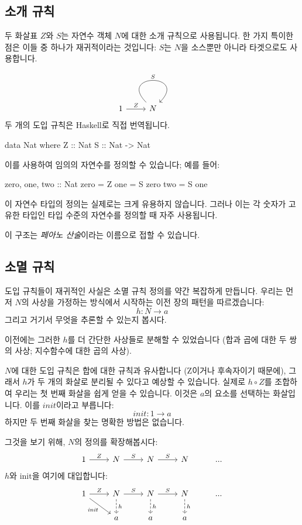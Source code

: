 \documentclass[DaoFP]{subfiles}
\begin{document}
\subsection{소개 규칙}

두 화살표 $Z$와 $S$는 자연수 객체 $N$에 대한 소개 규칙으로 사용됩니다. 한 가지 특이한 점은 이들 중 하나가 재귀적이라는 것입니다: $S$는 $N$을 소스뿐만 아니라 타겟으로도 사용합니다.

\[
 \begin{tikzcd}
 1
 \arrow[r, "Z"]
 &N
 \arrow[out=135, in=45, loop, "S"]
 \end{tikzcd}
\]
두 개의 도입 규칙은 Haskell로 직접 번역됩니다.

\begin{haskell}
data Nat where
  Z :: Nat
  S :: Nat -> Nat
\end{haskell}

이를 사용하여 임의의 자연수를 정의할 수 있습니다; 예를 들어:

\begin{haskell}
zero, one, two :: Nat
zero = Z
one  = S zero
two  = S one
\end{haskell}

이 자연수 타입의 정의는 실제로는 크게 유용하지 않습니다. 그러나 이는 각 숫자가 고유한 타입인 타입 수준의 자연수를 정의할 때 자주 사용됩니다.

이 구조는 \emph{페아노 산술}이라는 이름으로 접할 수 있습니다.

\subsection{소멸 규칙}

도입 규칙들이 재귀적인 사실은 소멸 규칙 정의를 약간 복잡하게 만듭니다. 우리는 먼저 $N$의 사상을 가정하는 방식에서 시작하는 이전 장의 패턴을 따르겠습니다:
\[ h \colon N \to a \]
그리고 거기서 무엇을 추론할 수 있는지 봅시다.

이전에는 그러한 $h$를 더 간단한 사상들로 분해할 수 있었습니다 (합과 곱에 대한 두 쌍의 사상; 지수함수에 대한 곱의 사상).

$N$에 대한 도입 규칙은 합에 대한 규칙과 유사합니다 (Z이거나 후속자이기 때문에), 그래서 $h$가 두 개의 화살로 분리될 수 있다고 예상할 수 있습니다. 실제로 $h \circ Z$를 조합하여 우리는 첫 번째 화살을 쉽게 얻을 수 있습니다. 이것은 $a$의 요소를 선택하는 화살입니다. 이를 $\mathit{init}$이라고 부릅니다:
\[\mathit{init} \colon 1 \to a \]
하지만 두 번째 화살을 찾는 명확한 방법은 없습니다.

그것을 보기 위해, $N$의 정의를 확장해봅시다:
\[
 \begin{tikzcd}
 1
 \arrow[r, "Z"]
 &N
  \arrow[r, "S"]
&N
  \arrow[r, "S"]
&N
& ...
  \end{tikzcd}
\]
$h$와 $\text{init}$을 여기에 대입합니다:
\[
 \begin{tikzcd}
 1
 \arrow[r, "Z"]
 \arrow[rd, "\mathit{init}"']
 &N
  \arrow[r, "S"]
\arrow[d, dashed, "h"]
&N
  \arrow[r, "S"]
\arrow[d, dashed, "h"]
&N
\arrow[d, dashed, "h"]
& ...
\\
& a
& a
& a
  \end{tikzcd}
\]
\end{document}

